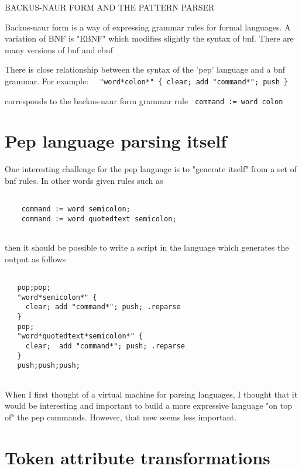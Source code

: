 \documentclass[a4paper,12pt]{article}
\begin{document}
BACKUS-NAUR FORM AND THE PATTERN PARSER

  Backus-naur form is a way of expressing grammar rules for formal languages.
  A variation of BNF is "EBNF" which modifies slightly the syntax of bnf.
  There are many versions of bnf and ebnf

  There is close relationship between the syntax of the 'pep' language
  and a bnf grammar. For example: 
 \verb|  "word*colon*" { clear; add "command*"; push } |


  corresponds to the backus-naur form grammar rule 
 \verb| command := word colon |


\section{Pep language parsing itself}

  One interesting challenge for the pep language is to "generate itself"
  from a set of bnf rules. In other words given rules such as 
 \begin{lstlisting}[breaklines] 

    command := word semicolon;
    command := word quotedtext semicolon;
  
 \end{lstlisting} 


  then it should be possible to write a script in the language
  which generates the output as follows 
 \begin{lstlisting}[breaklines] 

   pop;pop;
   "word*semicolon*" {
     clear; add "command*"; push; .reparse
   }
   pop;
   "word*quotedtext*semicolon*" {
     clear;  add "command*"; push; .reparse
   }
   push;push;push;
  
 \end{lstlisting} 


  When I first thought of a virtual machine for parsing languages,
  I thought that it would be interesting and important to build
  a more expressive language "on top of" the pep commands. However,
  that now seems less important.

\section{Token attribute transformations}
\end{document}
